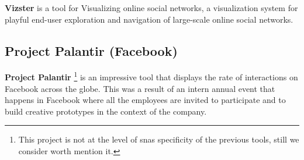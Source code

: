 \textbf{Vizster} \citep{heer2005vizster} is a tool for Visualizing online social networks, a visualization system for playful end-user exploration and navigation of large-scale online social networks.

\subsection{Project Palantir (Facebook)}

\textbf{Project Palantir} \citep{project-palantir} \footnote{This project is not at the level of \glspl{sna} specificity of the previous tools, still we consider worth mention it.} is an impressive tool that displays the rate of interactions on Facebook across the globe. This was a result of an intern annual event that happens in Facebook where all the employees are invited to participate and to build creative prototypes in the context of the company.
